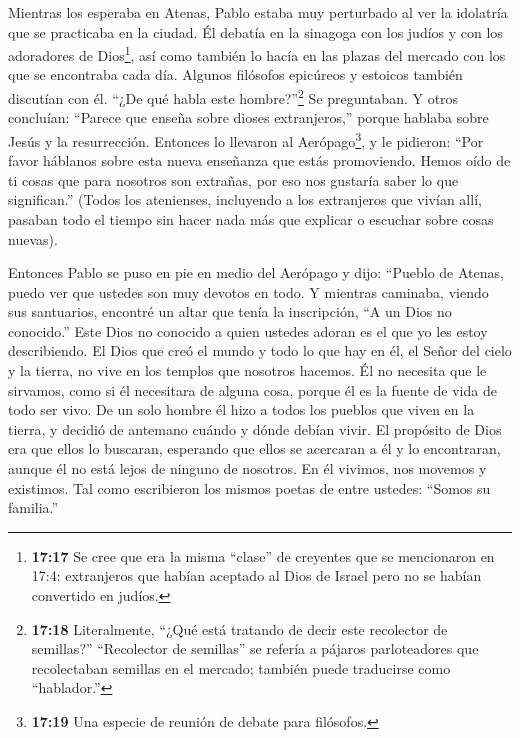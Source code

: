  Mientras los esperaba en Atenas, Pablo estaba muy
perturbado al ver la idolatría que se practicaba en la ciudad.
 Él debatía en la sinagoga con los judíos y con los
adoradores de Dios\footnote{\textbf{17:17} Se cree que era la misma
  ``clase'' de creyentes que se mencionaron en 17:4: extranjeros que
  habían aceptado al Dios de Israel pero no se habían convertido en
  judíos.}, así como también lo hacía en las plazas del mercado con los
que se encontraba cada día.  Algunos filósofos epicúreos y
estoicos también discutían con él. ``¿De qué habla este
hombre?''\footnote{\textbf{17:18} Literalmente, ``¿Qué está tratando de
  decir este recolector de semillas?'' ``Recolector de semillas'' se
  refería a pájaros parloteadores que recolectaban semillas en el
  mercado; también puede traducirse como ``hablador.''} Se preguntaban.
Y otros concluían: ``Parece que enseña sobre dioses extranjeros,''
porque hablaba sobre Jesús y la resurrección.  Entonces lo
llevaron al Aerópago\footnote{\textbf{17:19} Una especie de reunión de
  debate para filósofos.}, y le pidieron: ``Por favor háblanos sobre
esta nueva enseñanza que estás promoviendo.  Hemos oído de
ti cosas que para nosotros son extrañas, por eso nos gustaría saber lo
que significan.''  (Todos los atenienses, incluyendo a los
extranjeros que vivían allí, pasaban todo el tiempo sin hacer nada más
que explicar o escuchar sobre cosas nuevas).

 Entonces Pablo se puso en pie en medio del Aerópago y
dijo: ``Pueblo de Atenas, puedo ver que ustedes son muy devotos en todo.
 Y mientras caminaba, viendo sus santuarios, encontré un
altar que tenía la inscripción, ``A un Dios no conocido.'' Este Dios no
conocido a quien ustedes adoran es el que yo les estoy describiendo.
 El Dios que creó el mundo y todo lo que hay en él, el
Señor del cielo y la tierra, no vive en los templos que nosotros
hacemos.  Él no necesita que le sirvamos, como si él
necesitara de alguna cosa, porque él es la fuente de vida de todo ser
vivo.  De un solo hombre él hizo a todos los pueblos que
viven en la tierra, y decidió de antemano cuándo y dónde debían vivir.
 El propósito de Dios era que ellos lo buscaran, esperando
que ellos se acercaran a él y lo encontraran, aunque él no está lejos de
ninguno de nosotros.  En él vivimos, nos movemos y
existimos. Tal como escribieron los mismos poetas de entre ustedes:
``Somos su familia.''

